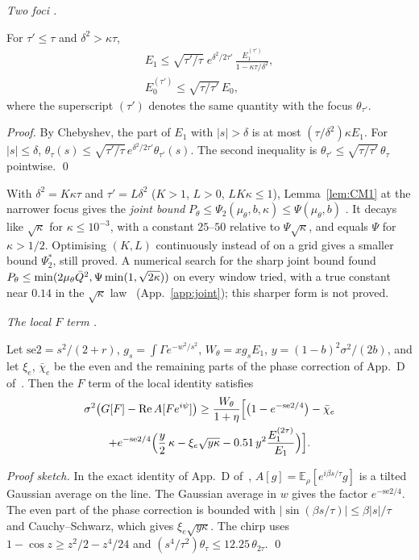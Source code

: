 \emph{Two foci \proofst.}
\begin{lemma} \proofst
\label{lem:CN1}
For $\tau'\le\tau$ and $\delta^2>\kappa\tau$,
\begin{gather}
E_1\le\sqrt{\tau'/\tau}\;e^{\delta^2/2\tau'}\,\frac{E_1^{(\tau')}}{1-\kappa\tau/\delta^2},\\
E_0^{(\tau')}\le\sqrt{\tau/\tau'}\,E_0 ,
\end{gather}
where the superscript $(\tau')$ denotes the same quantity with the focus $\theta_{\tau'}$.
\end{lemma}
\emph{Proof.} By Chebyshev, the part of $E_1$ with $|s|>\delta$ is at most $(\tau/\delta^2)\kappa E_1$.
For $|s|\le\delta$, $\theta_\tau(s)\le\sqrt{\tau'/\tau}\,e^{\delta^2/2\tau'}\theta_{\tau'}(s)$.
The second inequality is $\theta_{\tau'}\le\sqrt{\tau/\tau'}\,\theta_\tau$ pointwise. \qed

With $\delta^2=K\kappa\tau$ and $\tau'=L\delta^2$ ($K>1$, $L>0$, $LK\kappa\le1$), Lemma~\ref{lem:CM1} at the narrower focus gives the \emph{joint bound} $P_\theta\le\Psi_2(\mu_\theta,b,\kappa)\le\Psi(\mu_\theta,b)$ \proofst.
It decays like $\sqrt\kappa$ for $\kappa\le10^{-3}$, with a constant $25$--$50$ relative to $\Psi\sqrt\kappa$, and equals $\Psi$ for $\kappa>1/2$.
Optimising $(K,L)$ continuously instead of on a grid gives a smaller bound $\Psi_2^*$, still proved.
A numerical search for the sharp joint bound found $P_\theta\le\min(2\mu_\theta\bar Q^2,\Psi\min(1,\sqrt{2\kappa}))$ on every window tried, with a true constant near $0.14$ in the $\sqrt\kappa$ law \numst\ (App.~\ref{app:joint}); this sharper form is not proved.

\emph{The local $F$ term \proofst.}
\begin{lemma} \proofst
\label{lem:CN2}
Let $\mathrm{se2}=s^2/(2+r)$, $g_s=\int\Gamma e^{-w^2/s^2}$, $W_\theta=xg_sE_1$, $y=(1-b)^2\sigma^2/(2b)$, and let $\xi_e$, $\bar\chi_e$ be the even and the remaining parts of the phase correction of App.~D of~\cite{F}.
Then the $F$ term of the local identity satisfies
\begin{multline}
\sigma^2\bigl(G[F]-\mathrm{Re}\,A[Fe^{i\psi}]\bigr)\ge\frac{W_\theta}{1+\eta}\Bigl[\bigl(1-e^{-\mathrm{se2}/4}\bigr)-\bar\chi_e\\
+e^{-\mathrm{se2}/4}\Bigl(\frac y2\,\kappa-\xi_e\sqrt{y\kappa}-0.51\,y^2\frac{E_1^{(2\tau)}}{E_1}\Bigr)\Bigr].
\end{multline}
\end{lemma}
\emph{Proof sketch.} In the exact identity of App.~D of~\cite{F}, $A[g]=\mathbb E_\rho[e^{i\beta s/\tau}g]$ is a tilted Gaussian average on the line.
The Gaussian average in $w$ gives the factor $e^{-\mathrm{se2}/4}$.
The even part of the phase correction is bounded with $|\sin(\beta s/\tau)|\le\beta|s|/\tau$ and Cauchy--Schwarz, which gives $\xi_e\sqrt{y\kappa}$.
The chirp uses $1-\cos z\ge z^2/2-z^4/24$ and $(s^4/\tau^2)\theta_\tau\le12.25\,\theta_{2\tau}$. \qed

